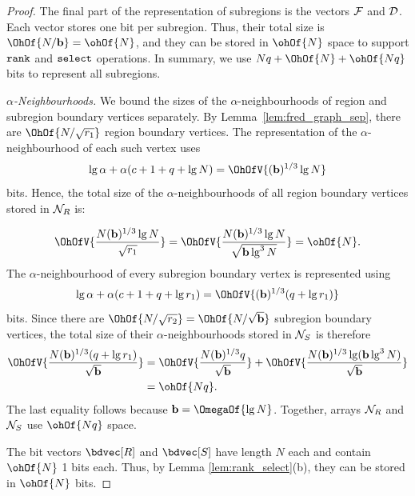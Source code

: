 {\begin{proof}
  The final part of the representation of subregions is the vectors
  $\mathcal{F}$ and $\mathcal{D}$.
  Each vector stores one bit per subregion.
  Thus, their total size is $\OhOf{N / \succblksize} = \ohOf{N}$, and they can be stored
  in $\ohOf{N}$ space to support $\texttt{rank}$ and $\texttt{select}$ operations.
  In summary, we use $N \bitsPerKey + \OhOf{N} + \ohOf{N \bitsPerKey}$ bits to represent all
  subregions.

  \textit{$\alpha$-Neighbourhoods.}  We bound the sizes of the
  $\alpha$-neighbourhoods of region and subregion boundary vertices
  separately.
  By Lemma~\ref{lem:fred_graph_sep}, there are $\OhOf{N / \sqrt{\regsz}}$
  region boundary vertices.
  The representation of the $\alpha$-neighbourhood of each such vertex uses
  \begin{equation*}
    \lg \alpha + \alpha(c + 1 + \bitsPerKey + \lg N) = \OhOfV{(\succblksize)^{1/3} \lg N}
  \end{equation*}
  bits.
  Hence, the total size of the $\alpha$-neighbourhoods of all
  region boundary vertices stored in $\mathcal{N}_R$ is: 
  
  \begin{equation*}
    \OhOfV{\frac{N (\succblksize)^{1/3} \lg N}{\sqrt{\regsz}}} =
    \OhOfV{\frac{N (\succblksize)^{1/3} \lg N}{\sqrt{\succblksize \lg^3 N}}} =
    \ohOf{N}.
  \end{equation*}
  The $\alpha$-neighbourhood of every subregion boundary vertex is
  represented using
  \begin{equation*}
    \lg \alpha + \alpha(c + 1 + \bitsPerKey + \lg \regsz) = \OhOfV{(\succblksize)^{1/3} (\bitsPerKey + \lg
      \regsz)}
  \end{equation*}
  bits.
  Since there are $\OhOf{N / \sqrt{\subregsz}} = \OhOf{N / \sqrt{\succblksize}}$
  subregion boundary vertices, the total size of their
  $\alpha$-neighbourhoods stored in $\mathcal{N}_S$ is therefore
  \begin{align*}
    \OhOfV{\frac{N (\succblksize)^{1/3} (\bitsPerKey + \lg \regsz)}{\sqrt{\succblksize}}} &=
    \OhOfV{\frac{N (\succblksize)^{1/3} \bitsPerKey}{\sqrt{\succblksize}}} +
    \OhOfV{\frac{N (\succblksize)^{1/3} \lg (\succblksize \lg^3 N)}{\sqrt{\succblksize}}}\\
    &= \ohOf{N \bitsPerKey}.
  \end{align*}
  The last equality follows because $\succblksize = \OmegaOf{\lg N}$.
  Together, arrays $\mathcal{N}_R$ and $\mathcal{N}_S$ use $\ohOf{N \bitsPerKey}$ space.

  The bit vectors $\regbdvec$ and $\subregbdvec$ have length $N$ each and
  contain $\ohOf{N}$ 1 bits each.
  Thus, by Lemma \ref{lem:rank_select}(b), they
  can be stored in $\ohOf{N}$ bits.
  

\end{proof}}
